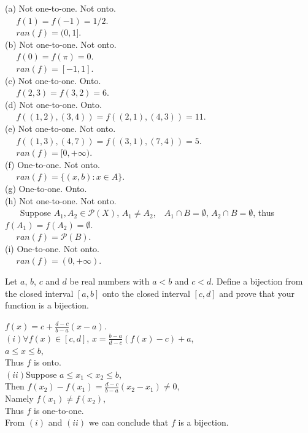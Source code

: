 \documentclass[11pt, a4paper, UTF8]{ctexart}
\begin{document}
\begin{solution}
  (a) Not one-to-one. Not onto.\\
  $~~~~~~f(1) = f(-1) = 1/2$.\\
  $~~~~~~ran(f) = (0,1]$.\\
  (b) Not one-to-one. Not onto.\\
  $~~~~~~f(0) = f(\pi) = 0$.\\
  $~~~~~~ran(f) = [-1,1]$.\\
  (c) Not one-to-one. Onto.\\
  $~~~~~~f(2,3) = f(3,2) = 6$.\\
  (d) Not one-to-one. Onto.\\
  $~~~~~~f((1,2),(3,4)) = f((2,1),(4,3)) = 11$.\\
  (e) Not one-to-one. Not onto.\\
  $~~~~~~f((1,3),(4,7)) = f((3,1),(7,4)) = 5$.\\
  $~~~~~~ran(f) = [0,+\infty)$.\\
  (f) One-to-one. Not onto.\\
  $~~~~~~ran(f) = \{(x,b):x \in A\}$.\\
  (g) One-to-one. Onto.\\
  (h) Not one-to-one. Not onto.\\
  $~~~~~~~~$Suppose $A_{1},A_{2} \in \mathcal{P}(X)$, $A_{1} \neq A_{2}$,~~$A_{1} \cap B = \emptyset$, 
  $A_{2} \cap B = \emptyset$, thus $f(A_{1}) = f(A_{2}) = \emptyset$.\\
  $~~~~~~ran(f) = \mathcal{P}(B)$.\\
  (i) One-to-one. Not onto.\\
  $~~~~~~ran(f) = (0,+\infty)$.
\end{solution}

\begin{problem}[UD: 14.12]
  Let $a$, $b$, $c$ and $d$ be real numbers with $a < b$ and $c < d$. Define a bijection 
  from the closed interval $[a,b]$ onto the closed interval $[c,d]$ and prove that your 
  function is a bijection.
\end{problem}

\begin{solution}
  $f(x) = c + \frac{d - c}{b - a}(x - a)$.\\
  $(i)\forall f(x) \in [c,d]$, $x = \frac{b - a}{d - c}(f(x) - c) + a$,\\
  $a \leq x \leq b$,\\
  Thus $f$ is onto.\\
  $(ii)$Suppose $a \leq x_{1} < x_{2} \leq b$,\\
  Then $f(x_{2}) - f(x_{1}) = \frac{d - c}{b - a}(x_{2} - x_{1}) \neq 0$,\\
  Namely $f(x_{1}) \neq f(x_{2})$,\\
  Thus $f$ is one-to-one.\\
  From $(i)$ and $(ii)$ we can conclude that $f$ is a bijection.
\end{solution}
\end{document}

